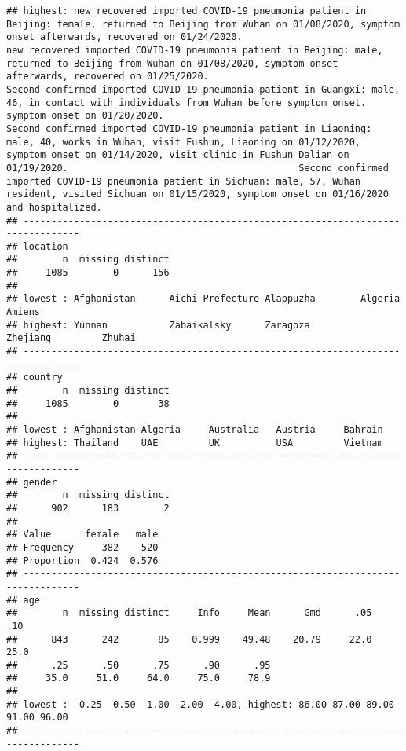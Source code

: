\documentclass[
]{article}
\begin{document}
\begin{verbatim}
## highest: new recovered imported COVID-19 pneumonia patient in Beijing: female, returned to Beijing from Wuhan on 01/08/2020, symptom onset afterwards, recovered on 01/24/2020.                                                                              new recovered imported COVID-19 pneumonia patient in Beijing: male, returned to Beijing from Wuhan on 01/08/2020, symptom onset afterwards, recovered on 01/25/2020.                                                                                Second confirmed imported COVID-19 pneumonia patient in Guangxi: male, 46, in contact with individuals from Wuhan before symptom onset. symptom onset on 01/20/2020.                                                                                Second confirmed imported COVID-19 pneumonia patient in Liaoning: male, 40, works in Wuhan, visit Fushun, Liaoning on 01/12/2020, symptom onset on 01/14/2020, visit clinic in Fushun Dalian on 01/19/2020.                                         Second confirmed imported COVID-19 pneumonia patient in Sichuan: male, 57, Wuhan resident, visited Sichuan on 01/15/2020, symptom onset on 01/16/2020 and hospitalized.                                                                            
## --------------------------------------------------------------------------------
## location 
##        n  missing distinct 
##     1085        0      156 
## 
## lowest : Afghanistan      Aichi Prefecture Alappuzha        Algeria          Amiens          
## highest: Yunnan           Zabaikalsky      Zaragoza         Zhejiang         Zhuhai          
## --------------------------------------------------------------------------------
## country 
##        n  missing distinct 
##     1085        0       38 
## 
## lowest : Afghanistan Algeria     Australia   Austria     Bahrain    
## highest: Thailand    UAE         UK          USA         Vietnam    
## --------------------------------------------------------------------------------
## gender 
##        n  missing distinct 
##      902      183        2 
##                         
## Value      female   male
## Frequency     382    520
## Proportion  0.424  0.576
## --------------------------------------------------------------------------------
## age 
##        n  missing distinct     Info     Mean      Gmd      .05      .10 
##      843      242       85    0.999    49.48    20.79     22.0     25.0 
##      .25      .50      .75      .90      .95 
##     35.0     51.0     64.0     75.0     78.9 
## 
## lowest :  0.25  0.50  1.00  2.00  4.00, highest: 86.00 87.00 89.00 91.00 96.00
## --------------------------------------------------------------------------------

\end{verbatim}
\end{document}

